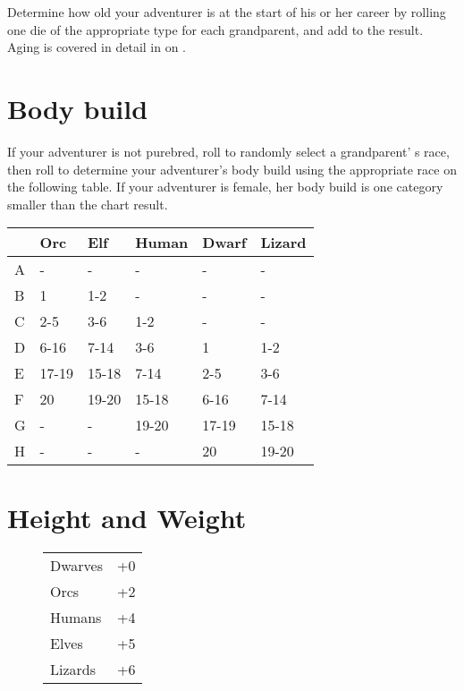 \begin{multicols*}{2}
Determine how old your adventurer is at the start of his or her career by rolling one die of the appropriate type for each grandparent, and add  to the result. Aging is covered in detail in  on .


\section{Body build}
If your adventurer is not purebred, roll  to randomly select a grandparent' s race, then roll  to determine your adventurer's body build using the appropriate race on the following table. If your adventurer is female, her body build is one category smaller than the chart result.
\begin{normboxc}
\small
\begin{tabular}{@{} l l l l l l }
 & \textbf{Orc} & \textbf{Elf} & \textbf{Human} & \textbf{Dwarf} & \textbf{Lizard}\\
\midrule
A & - & - & - & - & -\\
B & 1 & 1-2 & - & - & -\\
C & 2-5 & 3-6 & 1-2 & - & -\\
D & 6-16 & 7-14 & 3-6 & 1 & 1-2\\
E & 17-19 & 15-18 & 7-14 & 2-5 & 3-6\\
F & 20 & 19-20 & 15-18 & 6-16 & 7-14\\
G & - & - & 19-20 & 17-19 & 15-18\\
H & - & - & - & 20 & 19-20
\end{tabular}
\end{normboxc}
\section{Height and Weight}
\begin{wrapfigure}[7]{l}[0pt]{60pt}
\begin{normbox}
\small
{}
\begin{tabular}{@{}l l}
Dwarves & +0\\
Orcs & +2\\
Humans & +4\\
Elves & +5\\
Lizards & +6\\
\end{tabular}
\end{normbox}
\end{wrapfigure}


\end{multicols*}
